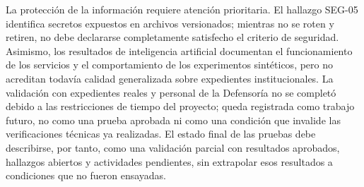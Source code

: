 La protección de la información requiere atención prioritaria. El hallazgo
SEG-05 identifica secretos expuestos en archivos versionados; mientras no se
roten y retiren, no debe declararse completamente satisfecho el criterio de
seguridad. Asimismo, los resultados de inteligencia artificial documentan el
funcionamiento de los servicios y el comportamiento de los experimentos
sintéticos, pero no acreditan todavía calidad generalizada sobre expedientes
institucionales. La validación con expedientes reales y personal de la
Defensoría no se completó debido a las restricciones de tiempo del proyecto;
queda registrada como trabajo futuro, no como una prueba aprobada ni como una
condición que invalide las verificaciones técnicas ya realizadas. El estado
final de las pruebas debe describirse, por tanto, como una validación parcial
con resultados aprobados, hallazgos abiertos y actividades pendientes, sin
extrapolar esos resultados a condiciones que no fueron ensayadas.